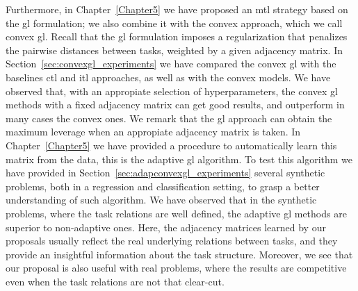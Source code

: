 Furthermore, in Chapter~\ref{Chapter5} we have proposed an \acrshort{mtl} strategy based on the \acrshort{gl} formulation; we also combine it with the convex approach, which we call convex \acrshort{gl}.
Recall that the \acrshort{gl} formulation imposes a regularization that penalizes the pairwise distances between tasks, weighted by a given adjacency matrix.
In Section~\ref{sec:convexgl_experiments} we have compared the convex \acrshort{gl} with the baselines \acrshort{ctl} and \acrshort{itl} approaches, as well as with the convex models. We have observed that, with an appropiate selection of hyperparameters, the convex \acrshort{gl} methods with a fixed adjacency matrix can get good results, and outperform in many cases the convex ones.
%
We remark that the \acrshort{gl} approach can obtain the maximum leverage when an appropiate adjacency matrix is taken. In Chapter~\ref{Chapter5} we have provided a procedure to automatically learn this matrix from the data, this is the adaptive \acrshort{gl} algorithm. To test this algorithm we have provided in Section~\ref{sec:adapconvexgl_experiments} several synthetic problems, both in a regression and classification setting, to grasp a better understanding of such algorithm. We have observed that in the synthetic problems, where the task relations are well defined, the adaptive \acrshort{gl} methods are superior to non-adaptive ones. 
%
Here, the adjacency matrices learned by our proposals usually reflect the real underlying relations between tasks, and they provide an insightful information about the task structure.
%
Moreover, we see that our proposal is also useful with real problems, where the results are competitive even when the task relations are not that clear-cut.

